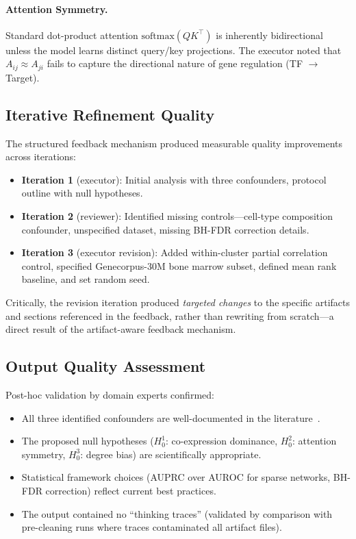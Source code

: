 \documentclass[10pt]{article}
\begin{document}
\paragraph{Attention Symmetry.}
Standard dot-product attention $\text{softmax}(QK^\top)$ is inherently bidirectional unless the model learns distinct query/key projections. The executor noted that $A_{ij} \approx A_{ji}$ fails to capture the directional nature of gene regulation (TF $\to$ Target).

\subsection{Iterative Refinement Quality}

The structured feedback mechanism produced measurable quality improvements across iterations:

\begin{itemize}
  \item \textbf{Iteration 1} (executor): Initial analysis with three confounders, protocol outline with null hypotheses.
  \item \textbf{Iteration 2} (reviewer): Identified missing controls---cell-type composition confounder, unspecified dataset, missing BH-FDR correction details.
  \item \textbf{Iteration 3} (executor revision): Added within-cluster partial correlation control, specified Genecorpus-30M bone marrow subset, defined mean rank baseline, and set random seed.
\end{itemize}

Critically, the revision iteration produced \emph{targeted changes} to the specific artifacts and sections referenced in the feedback, rather than rewriting from scratch---a direct result of the artifact-aware feedback mechanism.

\subsection{Output Quality Assessment}

Post-hoc validation by domain experts confirmed:
\begin{itemize}
  \item All three identified confounders are well-documented in the literature~\citep{pratapa2020benchmarking,theodoris2023transfer}.
  \item The proposed null hypotheses ($H_0^1$: co-expression dominance, $H_0^2$: attention symmetry, $H_0^3$: degree bias) are scientifically appropriate.
  \item Statistical framework choices (AUPRC over AUROC for sparse networks, BH-FDR correction) reflect current best practices.
  \item The output contained no ``thinking traces'' (validated by comparison with pre-cleaning runs where traces contaminated all artifact files).
\end{itemize}
\end{document}
